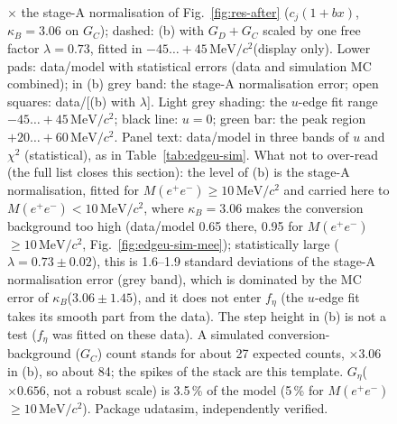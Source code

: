 \documentclass[11pt,a4paper]{article}
\newcommand{\Mee}{\ensuremath{M(e^{+}e^{-})}\xspace}
\newcommand{\MeVcc}{\ensuremath{\mathrm{MeV}/c^{2}}\xspace}
\newcommand{\kB}{\ensuremath{\kappa_B}\xspace}
\newcommand{\Geta}{\ensuremath{G_\eta}\xspace}
\begin{document}
\begin{figure}[!tbp]
{$\times$ the stage-A normalisation of Fig.~\ref{fig:res-after} ($c_j(1+bx)$, $\kB=3.06$ on $G_C$); dashed: (b) with $G_D+G_C$ scaled by one
free factor $\lambda=0.73$, fitted in $-45\ldots+45$\,\MeVcc (display only). Lower pads: data/model with statistical errors (data and
simulation MC combined); in (b) grey band: the stage-A normalisation error; open squares: data/[(b) with $\lambda$]. Light grey shading: the
$u$-edge fit range $-45\ldots+45$\,\MeVcc; black line: $u=0$; green bar: the peak region $+20\ldots+60$\,\MeVcc. Panel text: data/model in
three bands of $u$ and $\chi^2$ (statistical), as in Table~\ref{tab:edgeu-sim}. What not to over-read (the full list closes this section):
the level of (b) is the stage-A normalisation, fitted for \Mee$\ge10$\,\MeVcc and carried here to \Mee$<10$\,\MeVcc, where $\kB=3.06$ makes
the conversion background too high (data/model 0.65 there, 0.95 for \Mee$\ge10$\,\MeVcc, Fig.~\ref{fig:edgeu-sim-mee}); statistically large
($\lambda=0.73\pm0.02$), this is 1.6--1.9 standard deviations of the stage-A normalisation error (grey band), which is dominated by the MC
error of \kB ($3.06\pm1.45$), and it does not enter $f_\eta$ (the $u$-edge fit takes its smooth part from the data). The step height in (b)
is not a test ($f_\eta$ was fitted on these data). A simulated conversion-background ($G_C$) count stands for about 27 expected counts,
$\times3.06$ in (b), so about 84; the spikes of the stack are this template. \Geta ($\times0.656$, not a robust scale) is 3.5\,\% of the model
(5\,\% for \Mee$\ge10$\,\MeVcc). Package udatasim, independently verified.}
\label{fig:edgeu-sim}
\end{figure}
\end{document}
